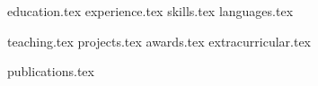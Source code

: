 \documentclass[letterpaper,11pt]{article}
\begin{document}


{education.tex}
{experience.tex}
\sidebyside
    {{skills.tex}}
    {{languages.tex}}

\pagebreak

{teaching.tex}
{projects.tex}
{awards.tex}
{extracurricular.tex}

{publications.tex}
\end{document}
